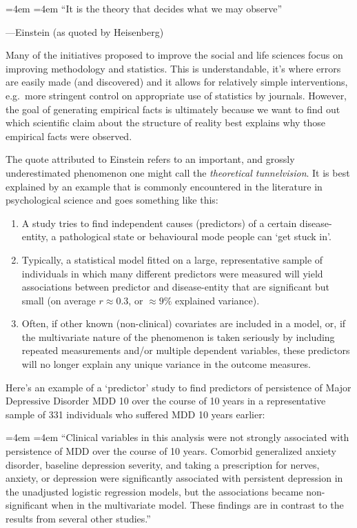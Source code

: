 \documentclass[12pt,]{book}
\providecommand{\tightlist}{%
  \setlength{\itemsep}{0pt}\setlength{\parskip}{0pt}}
\renewenvironment{quote}{%
  \par \small \medskip \block
  \leftskip=4em \rightskip=4em%
  \noindent \ignorespaces}{%
  \par \medskip
  }
\begin{document}
\begin{quote}
``It is the theory that decides what we may observe''

---Einstein (as quoted by Heisenberg)
\end{quote}

Many of the initiatives proposed to improve the social and life sciences focus on improving methodology and statistics. This is understandable, it's where errors are easily made (and discovered) and it allows for relatively simple interventions, e.g.~more stringent control on appropriate use of statistics by journals. However, the goal of generating empirical facts is ultimately because we want to find out which scientific claim about the structure of reality best explains why those empirical facts were observed.

The quote attributed to Einstein refers to an important, and grossly underestimated phenomenon one might call the \emph{theoretical tunnelvision}. It is best explained by an example that is commonly encountered in the literature in psychological science and goes something like this:

\begin{enumerate}
\def\labelenumi{\arabic{enumi}.}
\tightlist
\item
  A study tries to find independent causes (predictors) of a certain disease-entity, a pathological state or behavioural mode people can `get stuck in'.
\item
  Typically, a statistical model fitted on a large, representative sample of individuals in which many different predictors were measured will yield associations between predictor and disease-entity that are significant but small (on average \(r \approx 0.3\), or \(\approx 9\%\) explained variance).
\item
  Often, if other known (non-clinical) covariates are included in a model, or, if the multivariate nature of the phenomenon is taken seriously by including repeated measurements and/or multiple dependent variables, these predictors will no longer explain any unique variance in the outcome measures.
\end{enumerate}

Here's an example of a `predictor' study \citep{walker2015a} to find predictors of persistence of Major Depressive Disorder MDD 10 over the course of 10 years in a representative sample of 331 individuals who suffered MDD 10 years earlier:

\begin{quote}
``Clinical variables in this analysis were not strongly associated with persistence of MDD over the course of 10 years. Comorbid generalized anxiety disorder, baseline depression severity, and taking a prescription for nerves, anxiety, or depression were significantly associated with persistent depression in the unadjusted logistic regression models, but the associations became non-significant when in the multivariate model. These findings are in contrast to the results from several other studies.''
\end{quote}
\end{document}
